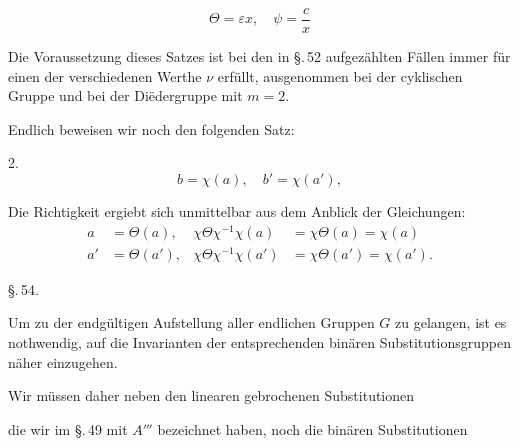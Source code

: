 \[
\Theta = \varepsilon x, \quad \psi = \frac{c}{x}
\]

Die Voraussetzung dieses Satzes ist bei den in \S.\,52 aufgezählten
 Fällen immer für einen der verschiedenen Werthe $\nu$
erfüllt, ausgenommen bei der cyklischen Gruppe und bei der
Diëdergruppe mit $m = 2$.

Endlich beweisen wir noch den folgenden Satz:

2.~
\[
b = \chi(a), \quad b' = \chi(a'),
\]

Die Richtigkeit ergiebt sich unmittelbar aus dem Anblick
der Gleichungen:
\[
\begin{aligned}
a &= \Theta(a), & \chi\Theta\chi^{-1}\chi(a) &= \chi\Theta(a) = \chi(a) \\
a' &= \Theta(a'), & \chi\Theta\chi^{-1}\chi(a') &= \chi\Theta(a') = \chi(a').
\end{aligned}
\]

\begin{center}
\S.\,54.

\end{center}

Um zu der endgültigen Aufstellung aller endlichen Gruppen
$G$ zu gelangen, ist es nothwendig, auf die Invarianten der entsprechenden
 binären Substitutionsgruppen näher einzugehen.

Wir müssen daher neben den linearen gebrochenen Substitutionen



die wir im \S.\,49 mit $A'''$ bezeichnet haben, noch die binären
Substitutionen

